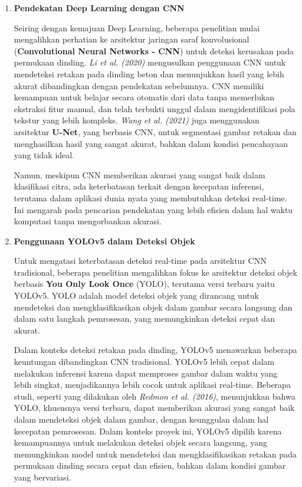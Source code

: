 \documentclass[12pt,a4paper]{article}
\begin{document}
\begin{adjustwidth}{3em}{0pt}
\begin{enumerate}
    \item \textbf{Pendekatan Deep Learning dengan CNN}
    
    \hspace{0.5cm} Seiring dengan kemajuan Deep Learning, beberapa penelitian mulai mengalihkan perhatian ke arsitektur jaringan saraf konvolusional (\textbf{Convolutional Neural Networks - CNN}) untuk deteksi kerusakan pada permukaan dinding. \textit{Li et al. (2020)} mengusulkan penggunaan CNN untuk mendeteksi retakan pada dinding beton dan menunjukkan hasil yang lebih akurat dibandingkan dengan pendekatan sebelumnya. CNN memiliki kemampuan untuk belajar secara otomatis dari data tanpa memerlukan ekstraksi fitur manual, dan telah terbukti unggul dalam mengidentifikasi pola tekstur yang lebih kompleks. \textit{Wang et al. (2021)} juga menggunakan arsitektur \textbf{U-Net}, yang berbasis CNN, untuk segmentasi gambar retakan dan menghasilkan hasil yang sangat akurat, bahkan dalam kondisi pencahayaan yang tidak ideal.

    \hspace{0.5cm} Namun, meskipun CNN memberikan akurasi yang sangat baik dalam klasifikasi citra, ada keterbatasan terkait dengan kecepatan inferensi, terutama dalam aplikasi dunia nyata yang membutuhkan deteksi real-time. Ini mengarah pada pencarian pendekatan yang lebih efisien dalam hal waktu komputasi tanpa mengorbankan akurasi.

    \item \textbf{Penggunaan YOLOv5 dalam Deteksi Objek}
    
    \hspace{0.5cm} Untuk mengatasi keterbatasan deteksi real-time pada arsitektur CNN tradisional, beberapa penelitian mengalihkan fokus ke arsitektur deteksi objek berbasis \textbf{You Only Look Once} (YOLO), terutama versi terbaru yaitu YOLOv5. YOLO adalah model deteksi objek yang dirancang untuk mendeteksi dan mengklasifikasikan objek dalam gambar secara langsung dan dalam satu langkah pemrosesan, yang memungkinkan deteksi cepat dan akurat.

    \hspace{0.5cm} Dalam konteks deteksi retakan pada dinding, YOLOv5 menawarkan beberapa keuntungan dibandingkan CNN tradisional. YOLOv5 lebih cepat dalam melakukan inferensi karena dapat memproses gambar dalam waktu yang lebih singkat, menjadikannya lebih cocok untuk aplikasi real-time. Beberapa studi, seperti yang dilakukan oleh \textit{Redmon et al. (2016)}, menunjukkan bahwa YOLO, khususnya versi terbaru, dapat memberikan akurasi yang sangat baik dalam mendeteksi objek dalam gambar, dengan keunggulan dalam hal kecepatan pemrosesan. Dalam konteks proyek ini, YOLOv5 dipilih karena kemampuannya untuk melakukan deteksi objek secara langsung, yang memungkinkan model untuk mendeteksi dan mengklasifikasikan retakan pada permukaan dinding secara cepat dan efisien, bahkan dalam kondisi gambar yang bervariasi.


\end{enumerate}
\end{adjustwidth}
\end{document}
